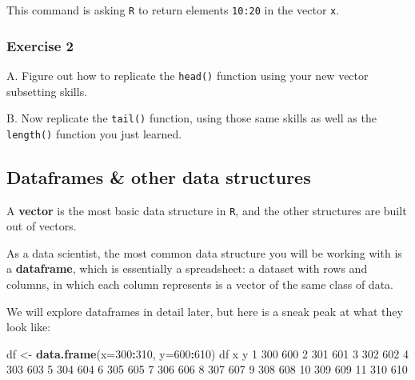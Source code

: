 \documentclass[
]{book}
\newenvironment{Shaded}{\begin{snugshade}}{\end{snugshade}}
\newcommand{\DataTypeTok}[1]{\textcolor[rgb]{0.13,0.29,0.53}{#1}}
\newcommand{\DecValTok}[1]{\textcolor[rgb]{0.00,0.00,0.81}{#1}}
\newcommand{\KeywordTok}[1]{\textcolor[rgb]{0.13,0.29,0.53}{\textbf{#1}}}
\newcommand{\NormalTok}[1]{#1}
\newcommand{\OperatorTok}[1]{\textcolor[rgb]{0.81,0.36,0.00}{\textbf{#1}}}
\newcommand{\StringTok}[1]{\textcolor[rgb]{0.31,0.60,0.02}{#1}}
\begin{document}
This command is asking \texttt{R} to return elements \texttt{10:20} in the vector \texttt{x}.

\hypertarget{exercise-2-2}{%
\subsubsection*{Exercise 2}\label{exercise-2-2}}

A. Figure out how to replicate the \texttt{head()} function using your new vector subsetting skills.

B. Now replicate the \texttt{tail()} function, using those same skills as well as the \texttt{length()} function you just learned.

\hypertarget{dataframes-other-data-structures}{%
\subsection*{Dataframes \& other data structures}\label{dataframes-other-data-structures}}

A \textbf{vector} is the most basic data structure in \texttt{R}, and the other structures are built out of vectors.

As a data scientist, the most common data structure you will be working with is a \textbf{dataframe}, which is essentially a spreadsheet: a dataset with rows and columns, in which each column represents is a vector of the same class of data.

We will explore dataframes in detail later, but here is a sneak peak at what they look like:

\begin{Shaded}
\begin{Highlighting}[]
\NormalTok{df <-}\StringTok{ }\KeywordTok{data.frame}\NormalTok{(}\DataTypeTok{x=}\DecValTok{300}\OperatorTok{:}\DecValTok{310}\NormalTok{,}
           \DataTypeTok{y=}\DecValTok{600}\OperatorTok{:}\DecValTok{610}\NormalTok{)}
\NormalTok{df}
\NormalTok{     x   y}
\DecValTok{1}  \DecValTok{300} \DecValTok{600}
\DecValTok{2}  \DecValTok{301} \DecValTok{601}
\DecValTok{3}  \DecValTok{302} \DecValTok{602}
\DecValTok{4}  \DecValTok{303} \DecValTok{603}
\DecValTok{5}  \DecValTok{304} \DecValTok{604}
\DecValTok{6}  \DecValTok{305} \DecValTok{605}
\DecValTok{7}  \DecValTok{306} \DecValTok{606}
\DecValTok{8}  \DecValTok{307} \DecValTok{607}
\DecValTok{9}  \DecValTok{308} \DecValTok{608}
\DecValTok{10} \DecValTok{309} \DecValTok{609}
\DecValTok{11} \DecValTok{310} \DecValTok{610}
\end{Highlighting}
\end{Shaded}
\end{document}
